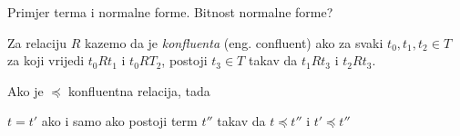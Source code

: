 \begin{primjer}
  Primjer terma i normalne forme. Bitnost normalne forme?
\end{primjer}

\begin{definition}
  Za relaciju $R$ kazemo da je \emph{konfluenta} (eng. confluent) ako za svaki $t_0, t_1, t_2 \in T$ za koji vrijedi $t_0 R t_1$ i $t_0 R T_2$, postoji $t_3 \in T$ takav da $t_1 R t_3$ i $t_2 R t_3$.
\end{definition}


\begin{teorem}
  Ako je $\preceq$ konfluentna relacija, tada
  \begin{center}
    $t = t'$ ako i samo ako postoji term $t''$ takav da $t \preceq t''$ i $t' \preceq t''$
  \end{center}
\end{teorem}

